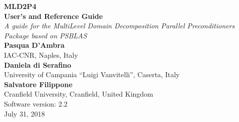 \documentclass[a4paper,twoside,11pt]{article}
\begin{document}
{\LARGE\bfseries MLD2P4\\[.8ex] User's and Reference Guide}\\[\baselineskip]
\emph{\large A guide for the MultiLevel Domain Decomposition 
Parallel Preconditioners Package
based on PSBLAS}\\[3ex]
{\large\bfseries Pasqua D'Ambra}\\
\large IAC-CNR, Naples, Italy\\[3ex]
{\large\bfseries Daniela di Serafino}\\
\large University of Campania ``Luigi Vanvitelli'', Caserta, Italy\\[3ex]
{\large\bfseries Salvatore Filippone} \\
\large Cranfield University, Cranfield, United Kingdom
\\[10ex]
Software version: 2.2\\
 July 31, 2018
\clearpage
\ \\
\thispagestyle{empty}
\clearpage

\setcounter{page}{1}    %


\cleardoublepage

\begingroup
  \renewcommand*{\thepage}{toc}
  \tableofcontents
\endgroup  
\cleardoublepage

\setcounter{page}{1}    %









\cleardoublepage
\appendix

\cleardoublepage

\end{document}
